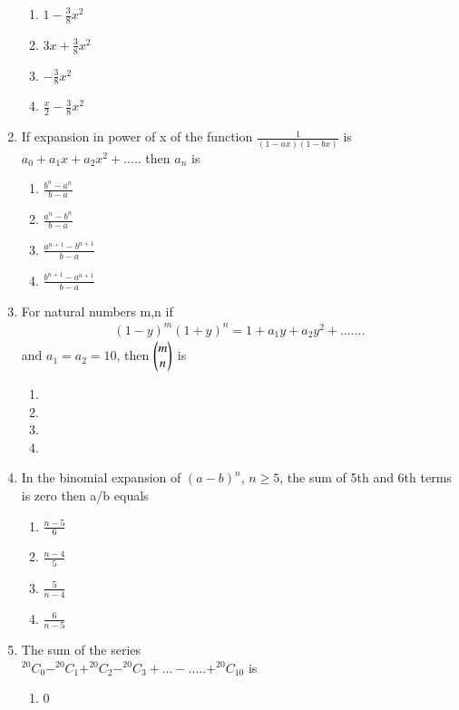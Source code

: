 \begin{enumerate}[label=\arabic*.,ref=\thesubsection.\theenumi]
\begin{enumerate}
    \item $1-\frac{3}{8}x^2$
    \item $3x+\frac{3}{8}x^2$
    \item $-\frac{3}{8}x^2$
    \item $\frac{x}{2}-\frac{3}{8}x^2$
\end{enumerate}
\item If expansion in power of x of the function $\frac{1}{(1-ax)(1-bx)}$ is $a_0+a_1x+a_2 x^2+.....$ then $a_n$ is
\begin{enumerate}
    \item $\frac{b^n-a^n}{b-a}$
    \item $\frac{a^n-b^n}{b-a}$
    \item $\frac{a^{n+1}-b^{n+1}}{b-a}$
    \item $\frac{b^{n+1}-a^{n+1}}{b-a}$
\end{enumerate}
\item For natural numbers m,n if 
\begin{align} 
(1-y)^m (1+y)^n=1+a_1y+a_2y^2+.......
\end{align} and $a_1=a_2=10$, then $\begin{pmatrix}m\\n\end{pmatrix}$ is
\begin{enumerate}
\item {}
\item {}
\item {}
\item {}
\end{enumerate}
\item In the binomial expansion of $(a-b)^n$, $n \geq 5$, the sum of 5th and 6th terms is zero then a/b equals
\begin{enumerate}
    \item $\frac{n-5}{6}$
    \item $\frac{n-4}{5}$
    \item $\frac{5}{n-4}$
    \item $\frac{6}{n-5}$
\end{enumerate}
\item The sum of the series\\
$^{20}C_0-^{20}C_1+^{20}C_2-^{20}C_3+...-.....+^{20}C_{10}$ is
\begin{enumerate}
    \item 0

\end{enumerate}
\end{enumerate}
